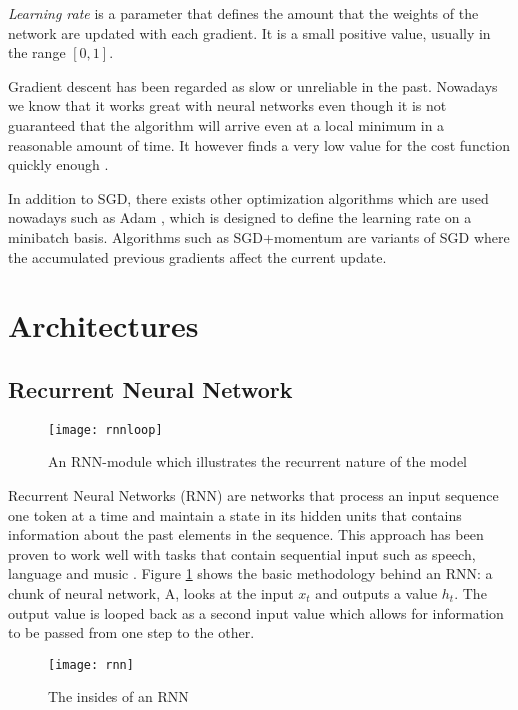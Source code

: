 \textit{Learning rate} is a parameter that defines the amount that the weights of the network are updated with each gradient.
It is a small positive value, usually in the range $[0, 1]$.

Gradient descent has been regarded as slow or unreliable in the past.
Nowadays we know that it works great with neural networks even though it is not guaranteed that the algorithm will arrive even at a local minimum in a reasonable amount of time.
It however finds a very low value for the cost function quickly enough \cite{goodfellow2016}.

In addition to SGD, there exists other optimization algorithms which are used nowadays such as Adam \cite{kingma2017}, which is designed to define the learning rate on a minibatch basis.
Algorithms such as SGD+momentum \cite{polyak1964} are variants of SGD where the accumulated previous gradients affect the current update.

\section{Architectures} \label{Architectures}
\subsection{Recurrent Neural Network} \label{Recurrent Neural Network}

\begin{figure}[t]
\texttt{[image: rnnloop]}
\centering
\caption{An RNN-module which illustrates the recurrent nature of the model}
\label{fig:rnnloop}
\end{figure}

Recurrent Neural Networks (RNN) are networks that process an input sequence one token at a time and maintain a state in its hidden units that contains information about the past elements in the sequence.
This approach has been proven to work well with tasks that contain sequential input such as speech, language and music \cite{lecun2015}.
Figure \ref{fig:rnnloop} shows the basic methodology behind an RNN: a chunk of neural network, A, looks at the input $x_t$ and outputs a value $h_t$. The output value is looped back as a second input value which allows for information to be passed from one step to the other.

\begin{figure}[t]
\texttt{[image: rnn]}
\centering
\caption{The insides of an RNN}
\label{fig:rnn}
\end{figure}

